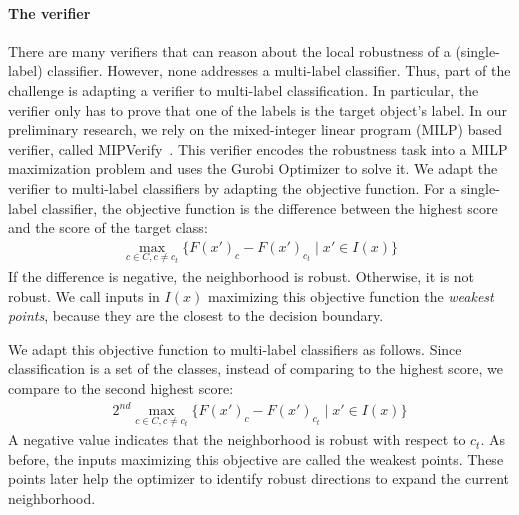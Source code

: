     \paragraph{The verifier}
    There are many verifiers that can reason about the local robustness of a (single-label) classifier.
    However, none addresses a multi-label classifier.
    Thus, part of the challenge is adapting a verifier to multi-label classification.
    In particular, the verifier only has to prove that one of the labels is the target object's label. %
    In our preliminary research, we rely on the mixed-integer linear program (MILP) based verifier, called MIPVerify~\cite{MIPVERIFY}.
    This verifier encodes the robustness task into a MILP maximization problem and uses the Gurobi Optimizer to solve it.
    We adapt the verifier to multi-label classifiers by adapting the objective function.
    For a single-label classifier, the objective function is the difference between the highest score and the score of the target class:
    \begin{gather*}
        \max_{c \in C, c \neq c_{t}}\{F(x')_c- F(x')_{c_{t}}\mid x'\in I(x)\} 
    \end{gather*}
    If the difference is negative, the neighborhood is robust. Otherwise, it is not robust.
    We call inputs in $I(x)$ maximizing this objective function the \emph{weakest points}, because they are the closest to the decision boundary.

    We adapt this objective function to multi-label classifiers as follows.
    Since classification is a set of the classes, instead of comparing to the highest score, we compare to the second highest score:
    \begin{gather*}
        2^{nd}\max_{c \in C, c \neq c_{t}}\{F(x')_c- F(x')_{c_{t}}\mid x'\in I(x)\} 
    \end{gather*}
    A negative value indicates that the neighborhood is robust with respect to $c_t$.
    As before, the inputs maximizing this objective are called the weakest points. These points later help the optimizer to identify robust directions to expand the current neighborhood.
    
